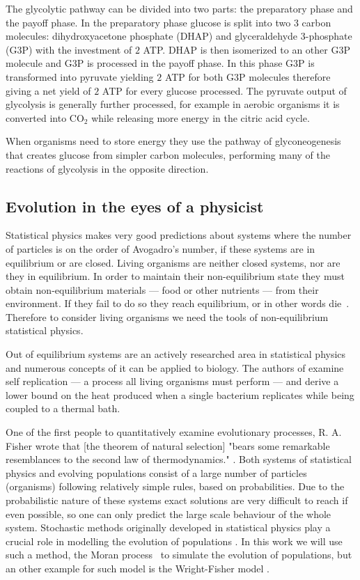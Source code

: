 \documentclass[a4paper,12pt]{article}
\begin{document}
The glycolytic pathway can be divided into two parts: the preparatory phase and the payoff phase. In the preparatory phase glucose is split into two $3$ carbon molecules: dihydroxyacetone phosphate (DHAP) and glyceraldehyde 3-phosphate (G3P) with the investment of $2$ ATP. DHAP is then isomerized to an other G3P molecule and G3P is processed in the payoff phase. In this phase G3P is transformed into pyruvate yielding $2$ ATP for both G3P molecules therefore giving a net yield of $2$ ATP for every glucose processed. The pyruvate output of glycolysis is generally further processed, for example in aerobic organisms it is converted into CO$_2$ while releasing more energy in the citric acid cycle. 

When organisms need to store energy they use the pathway of glyconeogenesis that creates glucose from simpler carbon molecules, performing many of the reactions of glycolysis in the opposite direction. %
	\subsection{Evolution in the eyes of a physicist}\label{chap:whereisphysics}

	Statistical physics makes very good predictions about systems where the number of particles is on the order of Avogadro's number, if these systems are in equilibrium or are closed. Living organisms are neither closed systems, nor are they in equilibrium. In order to maintain their non-equilibrium state they must obtain non-equilibrium materials --- food or other nutrients --- from their environment. If they fail to do so they reach equilibrium, or in other words die~\cite{irreversibility}. Therefore to consider living organisms we need the tools of non-equilibrium statistical physics. 

	Out of equilibrium systems are an actively researched area in statistical physics and numerous concepts of it can be applied to biology. The authors of \cite{selfreplication} examine self replication --- a process all living organisms must perform --- and derive a lower bound on the heat produced when a single bacterium replicates while being coupled to a thermal bath. 
	
	One of the first people to quantitatively examine evolutionary processes, R. A. Fisher wrote that [the theorem of natural selection] "bears some remarkable resemblances to the second law of thermodynamics." \cite{fisherevolution}. Both systems of statistical physics and evolving populations consist of a large number of particles (organisms) following relatively simple rules, based on probabilities. Due to the probabilistic nature of these systems exact solutions are very difficult to reach if even possible, so one can only predict the large scale behaviour of the whole system. Stochastic methods originally developed in statistical physics play a crucial role in modelling the evolution of populations \cite{stochasticblythe}. In this work we will use such a method, the Moran process \cite{moranprocess}~to simulate the evolution of populations, but an other example for such model is the Wright-Fisher model \cite{mathematicalpopgen}.
\end{document}
